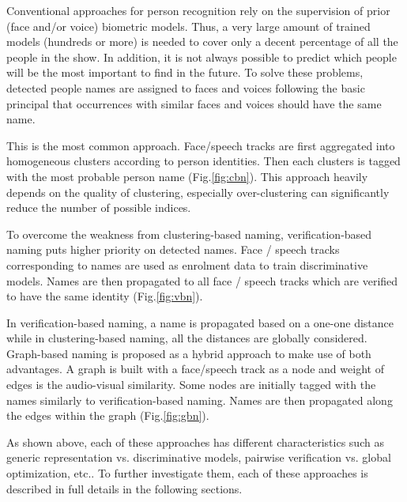 Conventional approaches for person recognition rely on the supervision of prior (face and/or voice) biometric models. Thus, a very large amount of trained models (hundreds or more) is needed to cover only a decent percentage of all the people in the show.
%
In addition, it is not always possible to predict which people will be the most important to find in the future.
%
To solve these problems, detected people names are assigned to faces and voices following the basic principal that occurrences with similar faces and voices should have the same name.
%

 This is the most common approach. Face/speech tracks are first aggregated into homogeneous clusters according to person identities. Then each clusters is tagged with the most probable person name (Fig.\ref{fig:cbn}). This approach heavily depends on the quality of clustering, especially over-clustering can significantly reduce the number of possible indices.

 To overcome the weakness from clustering-based naming, verification-based naming puts higher priority on detected names. Face / speech tracks corresponding to names are used as enrolment data to train discriminative models. Names are then propagated to all face / speech tracks which are verified to have the same identity (Fig.\ref{fig:vbn}).

 In verification-based naming, a name is propagated based on a one-one distance while in clustering-based naming, all the distances are globally considered. Graph-based naming is proposed as a hybrid approach to make use of both advantages.
A graph is built with a face/speech track as a node and weight of edges is the audio-visual similarity. Some nodes are initially tagged with the names similarly to verification-based naming. Names are then propagated along the edges within the graph (Fig.\ref{fig:gbn}).

As shown above, each of these approaches has different characteristics such as generic representation vs. discriminative models, pairwise verification vs. global optimization, etc..
%
To further investigate them, each of these approaches is described in full details in the following sections. 

\endinput